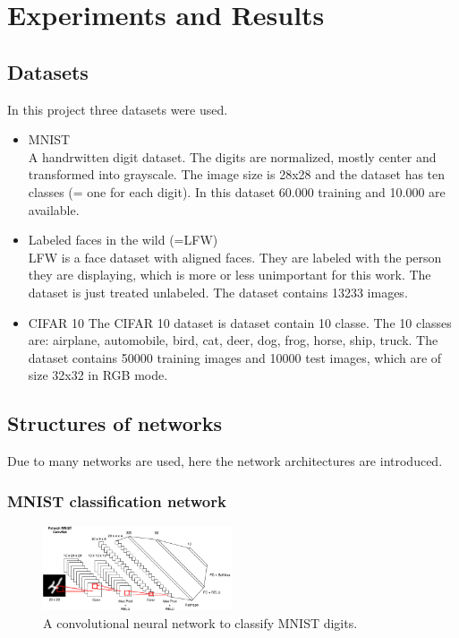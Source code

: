 \documentclass[
     11pt,         %
     a4paper,      %
     oneside,
     ]{article}
\begin{document}
\section{Experiments and Results}
\subsection{Datasets}
In this project three datasets were used.
\begin{itemize}
  \item MNIST \\
  A handrwitten digit dataset. The digits are normalized, mostly center and transformed into grayscale.
  The image size is 28x28 and the dataset has ten classes (= one for each digit). In this dataset 60.000 training and 10.000 are available.
  \item Labeled faces in the wild (=LFW)\\
  LFW is a face dataset with aligned faces. They are labeled with the person they are displaying, which is more or less unimportant for this work. The dataset is just treated unlabeled. The dataset contains 13233 images.
  \item CIFAR 10
  The CIFAR 10 dataset is dataset contain 10 classe. The 10 classes are: airplane, automobile, bird, cat, deer, dog, frog, horse, ship, truck. The dataset contains 50000 training images and 10000 test images, which are of size 32x32 in RGB mode.
\end{itemize}

\subsection{Structures of networks}
Due to many networks are used, here the network architectures are introduced.
\subsubsection{MNIST classification network}
\begin{figure}[H]
  \begin{center}
    \includegraphics[width=0.5\textwidth]{images/mnist_convet.png}
    \caption{A convolutional neural network to classify MNIST digits.}
  \end{center}
\end{figure}
\end{document}
